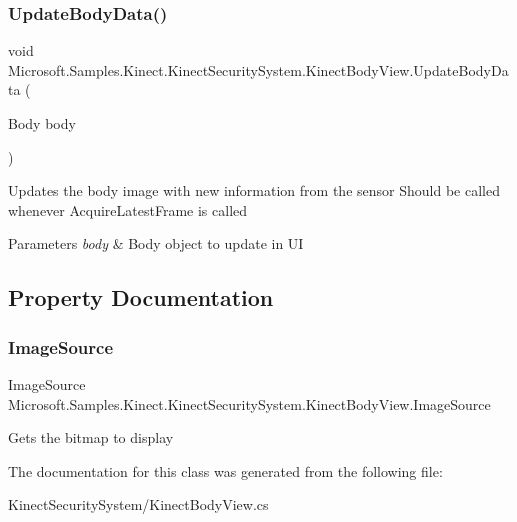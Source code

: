 \subsubsection{\texorpdfstring{Update\+Body\+Data()}{UpdateBodyData()}}
{\footnotesize\ttfamily void Microsoft.\+Samples.\+Kinect.\+Kinect\+Security\+System.\+Kinect\+Body\+View.\+Update\+Body\+Data (\begin{DoxyParamCaption}\item[{Body}]{body }\end{DoxyParamCaption})}



Updates the body image with new information from the sensor Should be called whenever Acquire\+Latest\+Frame is called 


\begin{DoxyParams}{Parameters}
{\em body} & Body object to update in UI\\
\hline
\end{DoxyParams}


\subsection{Property Documentation}
\mbox{\label{class_microsoft_1_1_samples_1_1_kinect_1_1_kinect_security_system_1_1_kinect_body_view_a45db69ab0cd1a00c9e57377541d5fe8b}} 
\subsubsection{\texorpdfstring{Image\+Source}{ImageSource}}
{\footnotesize\ttfamily Image\+Source Microsoft.\+Samples.\+Kinect.\+Kinect\+Security\+System.\+Kinect\+Body\+View.\+Image\+Source\hspace{0.3cm}{\ttfamily [get]}}



Gets the bitmap to display 



The documentation for this class was generated from the following file\+:\begin{DoxyCompactItemize}
\item 
Kinect\+Security\+System/Kinect\+Body\+View.\+cs\end{DoxyCompactItemize}

